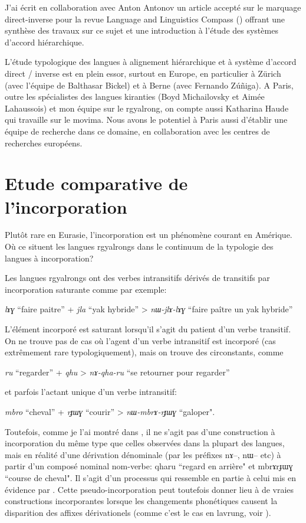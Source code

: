 \documentclass[oldfontcommands,oneside,a4paper,11pt]{memoir}
\newcommand{\ipa}[1]{{\phon #1}} %
\begin{document}
J'ai écrit en collaboration avec Anton Antonov un article accepté sur le marquage direct-inverse pour la revue Language and Linguistics Compass (\citealt{jacques14inverse}) offrant une synthèse des travaux sur ce sujet et une introduction à l'étude des systèmes d'accord hiérarchique.

L'étude typologique des langues à alignement hiérarchique et à système d'accord direct / inverse est en plein essor, surtout en Europe, en particulier à Zürich (avec l'équipe de Balthasar Bickel) et à Berne (avec Fernando Zúñiga). A Paris, outre les spécialistes des langues kiranties (Boyd Michailovsky et Aimée Lahaussois) et mon équipe sur le rgyalrong, on compte aussi Katharina Haude qui travaille sur le movima. Nous avons le potentiel à Paris aussi d'établir une équipe de recherche dans ce domaine, en collaboration avec les centres de recherches   européens.

\section{Etude comparative de l'incorporation} \label{sec:incorp}

 Plutôt rare en Eurasie, l'incorporation est un phénomène courant en Amérique. Où ce situent les langues rgyalrongs dans le continuum de la typologie des langues à incorporation? 

Les langues rgyalrongs ont des verbes intransitifs dérivés de transitifs par incorporation saturante comme par exemple:

\textit{lɤɣ} ``faire paitre'' + \textit{jla} ``yak hybride'' > \textit{nɯ-jlɤ-lɤɣ} ``faire paître un yak hybride''

L'élément incorporé est saturant lorsqu'il s'agit du patient d'un verbe transitif. On ne trouve pas de cas où l'agent d'un verbe intransitif est incorporé (cas extrêmement rare typologiquement), mais on trouve des circonstants, comme

\textit{ru} ``regarder'' + \textit{qhu} > \textit{nɤ-qha-ru} ``se retourner pour regarder''

et parfois l'actant unique d'un verbe intransitif:


\textit{mbro} ``cheval'' + \textit{rɟɯɣ} ``courir'' > \textit{nɯ-mbrɤ-rɟɯɣ} ``galoper".

Toutefois, comme je l'ai montré dans \citet{jacques12incorp}, il ne s'agit pas d'une construction à incorporation du même type que celles observées dans la plupart des langues, mais en réalité d'une dérivation dénominale (par les préfixes \ipa{nɤ}--, \ipa{nɯ}-- etc) à partir d'un composé nominal nom-verbe: \ipa{qharu} ``regard en arrière" et \ipa{mbrɤrɟɯɣ} ``course de cheval". Il s'agit d'un processus qui ressemble en partie à celui mis en évidence par \citet{benveniste66incorp}. Cette pseudo-incorporation peut toutefois donner lieu à de vraies constructions incorporantes lorsque les changements phonétiques causent la disparition des affixes dérivationels (comme c'est le cas en lavrung, voir \citet{lai13affixale}).
\end{document}
